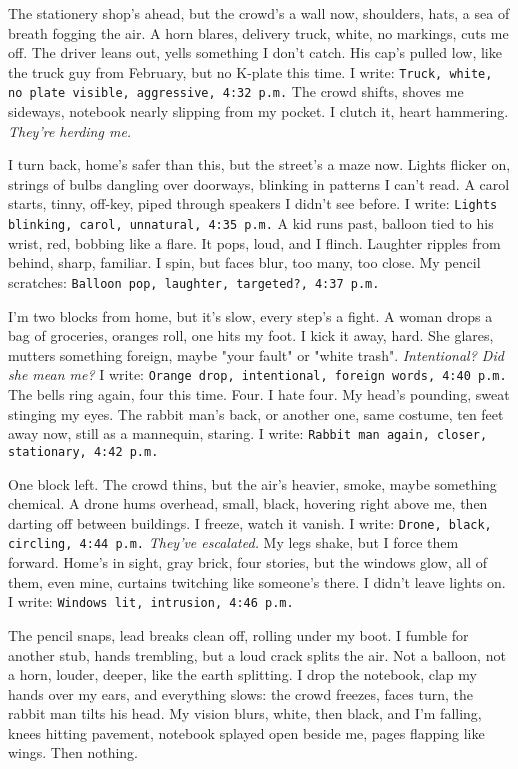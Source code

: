 \documentclass[12pt,oneside]{book}
\newcommand{\note}[1]{\texttt{#1}}
\begin{document}
The stationery shop’s ahead, but the crowd’s a wall now, shoulders, hats, a sea of breath fogging the air. A horn blares, delivery truck, white, no markings, cuts me off. The driver leans out, yells something I don’t catch. His cap’s pulled low, like the truck guy from February, but no K-plate this time. I write: \note{Truck, white, no plate visible, aggressive, 4:32 p.m.} The crowd shifts, shoves me sideways, notebook nearly slipping from my pocket. I clutch it, heart hammering. \textit{They’re herding me.} 

I turn back, home’s safer than this, but the street’s a maze now. Lights flicker on, strings of bulbs dangling over doorways, blinking in patterns I can’t read. A carol starts, tinny, off-key, piped through speakers I didn’t see before. I write: \note{Lights blinking, carol, unnatural, 4:35 p.m.} A kid runs past, balloon tied to his wrist, red, bobbing like a flare. It pops, loud, and I flinch. Laughter ripples from behind, sharp, familiar. I spin, but faces blur, too many, too close. My pencil scratches: \note{Balloon pop, laughter, targeted?, 4:37 p.m.}

I’m two blocks from home, but it’s slow, every step’s a fight. A woman drops a bag of groceries, oranges roll, one hits my foot. I kick it away, hard. She glares, mutters something foreign, maybe "your fault" or "white trash". \textit{Intentional? Did she mean me?} I write: \note{Orange drop, intentional, foreign words, 4:40 p.m.} The bells ring again, four this time. Four. I hate four. My head’s pounding, sweat stinging my eyes. The rabbit man’s back, or another one, same costume, ten feet away now, still as a mannequin, staring. I write: \note{Rabbit man again, closer, stationary, 4:42 p.m.}

One block left. The crowd thins, but the air’s heavier, smoke, maybe something chemical. A drone hums overhead, small, black, hovering right above me, then darting off between buildings. I freeze, watch it vanish. I write: \note{Drone, black, circling, 4:44 p.m.} \textit{They’ve escalated.} My legs shake, but I force them forward. Home’s in sight, gray brick, four stories, but the windows glow, all of them, even mine, curtains twitching like someone’s there. I didn’t leave lights on. I write: \note{Windows lit, intrusion, 4:46 p.m.}

The pencil snaps, lead breaks clean off, rolling under my boot. I fumble for another stub, hands trembling, but a loud crack splits the air. Not a balloon, not a horn, louder, deeper, like the earth splitting. I drop the notebook, clap my hands over my ears, and everything slows: the crowd freezes, faces turn, the rabbit man tilts his head. My vision blurs, white, then black, and I’m falling, knees hitting pavement, notebook splayed open beside me, pages flapping like wings. Then nothing.
\end{document}
